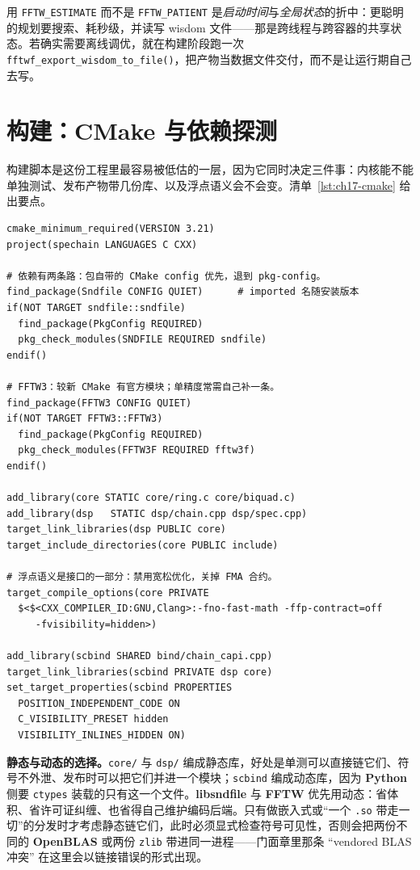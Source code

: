 \documentclass[12pt,a4paper,fontset=fandol]{ctexbook}
\newcommand{\Fn}[1]{\texttt{#1()}}
\newcommand{\Tp}[1]{\texttt{#1}}
\newcommand{\Lib}[1]{\textbf{#1}}
\newcommand{\Lang}[1]{\textsf{\bfseries #1}}
\newcommand{\PY}{\Lang{Python}}
\begin{document}
用 \Tp{FFTW\_ESTIMATE} 而不是 \Tp{FFTW\_PATIENT} 是\emph{启动时间}与\emph{全局状态}的折中：更聪明的规划要搜索、耗秒级，并读写 wisdom 文件——那是跨线程与跨容器的共享状态。若确实需要离线调优，就在构建阶段跑一次 \Fn{fftwf\_export\_wisdom\_to\_file}，把产物当数据文件交付，而不是让运行期自己去写。

\section{构建：CMake 与依赖探测}

构建脚本是这份工程里最容易被低估的一层，因为它同时决定三件事：内核能不能单独测试、发布产物带几份库、以及浮点语义会不会变。清单~\ref{lst:ch17-cmake} 给出要点。

\begin{lstlisting}[style=cmakestyle,caption={CMake 要点：两条探测路径、目标分层、显式关掉宽松浮点},label={lst:ch17-cmake}]
cmake_minimum_required(VERSION 3.21)
project(spechain LANGUAGES C CXX)

# 依赖有两条路：包自带的 CMake config 优先，退到 pkg-config。
find_package(Sndfile CONFIG QUIET)      # imported 名随安装版本
if(NOT TARGET sndfile::sndfile)
  find_package(PkgConfig REQUIRED)
  pkg_check_modules(SNDFILE REQUIRED sndfile)
endif()

# FFTW3：较新 CMake 有官方模块；单精度常需自己补一条。
find_package(FFTW3 CONFIG QUIET)
if(NOT TARGET FFTW3::FFTW3)
  find_package(PkgConfig REQUIRED)
  pkg_check_modules(FFTW3F REQUIRED fftw3f)
endif()

add_library(core STATIC core/ring.c core/biquad.c)
add_library(dsp   STATIC dsp/chain.cpp dsp/spec.cpp)
target_link_libraries(dsp PUBLIC core)
target_include_directories(core PUBLIC include)

# 浮点语义是接口的一部分：禁用宽松优化，关掉 FMA 合约。
target_compile_options(core PRIVATE
  $<$<CXX_COMPILER_ID:GNU,Clang>:-fno-fast-math -ffp-contract=off
     -fvisibility=hidden>)

add_library(scbind SHARED bind/chain_capi.cpp)
target_link_libraries(scbind PRIVATE dsp core)
set_target_properties(scbind PROPERTIES
  POSITION_INDEPENDENT_CODE ON
  C_VISIBILITY_PRESET hidden
  VISIBILITY_INLINES_HIDDEN ON)
\end{lstlisting}

\textbf{静态与动态的选择。}\Tp{core/} 与 \Tp{dsp/} 编成静态库，好处是单测可以直接链它们、符号不外泄、发布时可以把它们并进一个模块；\Tp{scbind} 编成动态库，因为 \PY{} 侧要 \Tp{ctypes} 装载的只有这一个文件。\Lib{libsndfile} 与 \Lib{FFTW} 优先用动态：省体积、省许可证纠缠、也省得自己维护编码后端。只有做嵌入式或``一个 \Tp{.so} 带走一切''的分发时才考虑静态链它们，此时必须显式检查符号可见性，否则会把两份不同的 \Lib{OpenBLAS} 或两份 \Tp{zlib} 带进同一进程——门面章里那条 ``vendored BLAS 冲突'' 在这里会以链接错误的形式出现。
\end{document}
